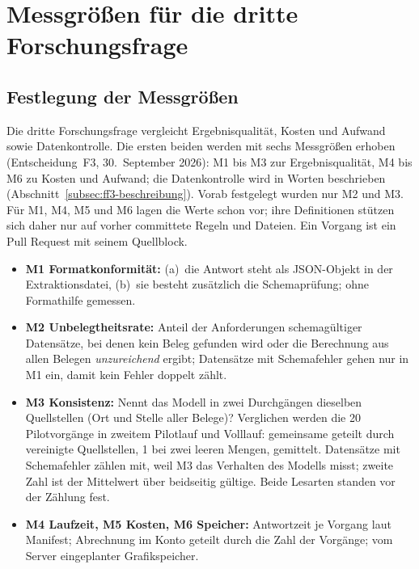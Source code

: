 \documentclass[11pt,a4paper]{report}
\begin{document}
\section{Messgrößen für die dritte Forschungsfrage}
\label{sec:eval-ff3}

\subsection{Festlegung der Messgrößen}
\label{subsec:ff3-festlegung}

Die dritte Forschungsfrage vergleicht Ergebnisqualität, Kosten und
Aufwand sowie Datenkontrolle. Die ersten beiden werden mit sechs
Messgrößen erhoben (Entscheidung~F3, 30.~September 2026): M1 bis M3 zur
Ergebnisqualität, M4 bis M6 zu Kosten und Aufwand; die Datenkontrolle
wird in Worten beschrieben (Abschnitt~\ref{subsec:ff3-beschreibung}).
Vorab festgelegt wurden nur M2 und M3. Für M1, M4, M5 und M6 lagen die
Werte schon vor; ihre Definitionen stützen sich daher nur auf vorher
committete Regeln und Dateien. Ein Vorgang ist ein Pull Request mit
seinem Quellblock.

\begin{itemize}
  \item \textbf{M1 Formatkonformität:} (a)~die Antwort steht als
    JSON-Objekt in der Extraktionsdatei, (b)~sie besteht zusätzlich die
    Schemaprüfung; ohne Formathilfe gemessen.
  \item \textbf{M2 Unbelegtheitsrate:} Anteil der Anforderungen
    schemagültiger Datensätze, bei denen kein Beleg gefunden wird oder
    die Berechnung aus allen Belegen \emph{unzureichend} ergibt;
    Datensätze mit Schemafehler gehen nur in M1 ein, damit kein Fehler
    doppelt zählt.
  \item \textbf{M3 Konsistenz:} Nennt das Modell in zwei Durchgängen dieselben
    Quellstellen (Ort und Stelle aller Belege)? Verglichen werden die 20
    Pilotvorgänge in zweitem Pilotlauf und Volllauf: gemeinsame geteilt
    durch vereinigte Quellstellen, 1 bei zwei leeren Mengen, gemittelt.
    Datensätze mit Schemafehler zählen mit, weil M3 das Verhalten des
    Modells misst; zweite Zahl ist der Mittelwert über beidseitig gültige.
    Beide Lesarten standen vor der Zählung fest.
  \item \textbf{M4 Laufzeit, M5 Kosten, M6 Speicher:} Antwortzeit je
    Vorgang laut Manifest; Abrechnung im Konto geteilt durch die Zahl
    der Vorgänge; vom Server eingeplanter Grafikspeicher.
\end{itemize}
\end{document}
